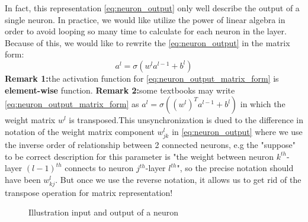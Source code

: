 In fact, this representation \eqref{eq:neuron_output} only well describe the output of a single neuron. In practice, we would like utilize the power of linear algebra in order to avoid looping so many time to calculate for each neuron in the layer. Because of this, we would like to rewrite the \eqref{eq:neuron_output} in the matrix form:
\begin{equation}\label{eq:neuron_output_matrix_form}
	a^{l} = \sigma\left(w^{l}a^{l-1} + b^{l}\right)
\end{equation}
\textbf{Remark 1:}the activation function for \eqref{eq:neuron_output_matrix_form} is \textbf{element-wise} function.\newline\noindent
\textbf{Remark 2:}some textbooks may write \eqref{eq:neuron_output_matrix_form} as $a^{l} = \sigma\left((w^{l})^{T}a^{l-1} + b^{l}\right)$ in which the weight matrix $w^{l}$ is transposed.This unsynchronization is dued to the difference in notation of the weight matrix component $w^{l}_{jk}$ in \eqref{eq:neuron_output} where we use the inverse order of relationship between 2 connected neurons, e.g the "suppose" to be correct description for this parameter is "the weight between neuron $k^{th}$-layer $(l-1)^{th}$ connects to neuron $j^{th}$-layer $l^{th}$", so the precise notation should have been \textbf{$w^{l}_{kj}$}. But once we use the reverse notation, it allows us to get rid of the transpose operation for matrix representation!

\begin{figure}[H]
\centering
	\caption{Illustration input and output of a neuron}
\end{figure}

